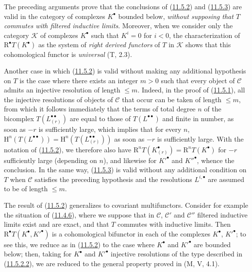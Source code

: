 \begin{remark}[11.5.4]
\label{0.11.5.4}
The preceding arguments prove that the conclusions of
(\hyperref[0.11.5.2]{11.5.2}) and
(\hyperref[0.11.5.3]{11.5.3}) are valid in the category of
complexes $K^\bullet$ bounded below, \emph{without supposing that $T$
commutes with filtered inductive limits}. Moreover, when we consider
only the category $\mathcal K$ of complexes $K^\bullet$ such that
$K^i=0$ for $i<0$, the characterization of $\mathrm R^\bullet T(K^\bullet)$
as the system of \emph{right derived functors} of $T$ in $\mathcal K$
shows that this cohomological functor is \emph{universal} (T, 2.3).

Another case in which (\hyperref[0.11.5.2]{11.5.2}) is valid without making
any additional hypothesis on $T$ is the case where there exists an integer $m>0$
such that every object of $\mathcal C$ admits an injective resolution of length
$\leq m$. Indeed, in the proof of
(\hyperref[0.11.5.1]{11.5.1}), all the injective resolutions of objects
of $\mathcal C$ that occur can be taken of length $\leq m$,
from which it follows immediately that the terms of total degree $n$ of the bicomplex
$T(L_{(r)}^{\bullet\bullet})$ are equal to those of
$T(L^{\bullet\bullet})$ and finite in number, as soon as $-r$ is sufficiently large, which
implies that for every $n$,
$\mathrm H^n(T(L^{\bullet\bullet}))=
\mathrm H^n(T(L_{(r)}^{\bullet\bullet}))$ as soon as $-r$ is sufficiently large. With
the notation of (\hyperref[0.11.5.2]{11.5.2}), we therefore also have
$\mathrm R^nT(K_{(r)}^\bullet)=\mathrm R^nT(K^\bullet)$ for $-r$ sufficiently large
(depending on $n$), and likewise for $K'^\bullet$ and $K''^\bullet$, whence the
conclusion. In the same way, (\hyperref[0.11.5.3]{11.5.3}) is valid
without any additional condition on $T$ when $\mathcal C$ satisfies
the preceding hypothesis and the resolutions
$L^{i,\bullet}$ are assumed to be of length $\leq m$.
\end{remark}

\begin{env}[11.5.5]
\label{0.11.5.5}
The result of (\hyperref[0.11.5.2]{11.5.2}) generalizes to
covariant multifunctors. Consider for example the situation of
(\hyperref[0.11.4.6]{11.4.6}), where we suppose that in $\mathcal C$,
$\mathcal C'$ and $\mathcal C''$
filtered inductive limits exist and are exact, and that $T$ commutes
with inductive limits. Then $\mathrm R^\bullet T(K^\bullet,K'^\bullet)$ is
a cohomological bifunctor in each of the complexes $K^\bullet$,
$K'^\bullet$; to see this, we reduce as in
(\hyperref[0.11.5.2]{11.5.2}) to the case where $K^\bullet$ and $K'^\bullet$ are
bounded below; then, taking for $K^\bullet$ and $K'^\bullet$
injective resolutions of the type described in
(\hyperref[0.11.5.2.2]{11.5.2.2}), we are reduced to the general property
proved in (M, V, 4.1).
\end{env}

